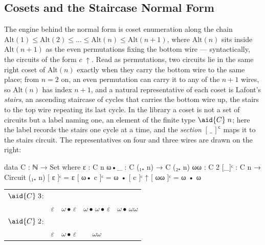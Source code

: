 \subsection{Cosets and the Staircase Normal Form}\label{sec:case-nf}

The engine behind the normal form is coset enumeration along the chain $\mathrm{Alt}(1) \le \mathrm{Alt}(2) \le \dots \le \mathrm{Alt}(n) \le \mathrm{Alt}(n{+}1)$, where $\mathrm{Alt}(n)$ sits inside $\mathrm{Alt}(n{+}1)$ as the even permutations fixing the bottom wire --- syntactically, the circuits of the form $c\;{\uparrow}$. Read as permutations, two circuits lie in the same right coset of $\mathrm{Alt}(n)$ exactly when they carry the bottom wire to the same place; from $n = 2$ on, an even permutation can carry it to any of the $n{+}1$ wires, so $\mathrm{Alt}(n)$ has index $n{+}1$, and a natural representative of each coset is Lafont's \emph{stairs}, an ascending staircase of cycles that carries the bottom wire up, the stairs to the top wire repeating its last cycle. In the library a coset is not a set of circuits but a label naming one, an element of the finite type $\aid{C}\;n$; here the label records the stairs one cycle at a time, and the \emph{section} $[\,\_\,]^{\mathsf c}$ maps it to the stairs circuit. The representatives on four and three wires are drawn on the right:

\begin{center}
\begin{minipage}[c]{0.37\linewidth}
\begingroup\setlength{\mathindent}{0pt}
\begin{code}
data C : ℕ → Set where
  ε   : C n
  ω•_ : C (₁₊ n) → C (₂₊ n)
  ωω  : C 2
[_]ᶜ : C n → Circuit (₁₊ n)
[ ε    ]ᶜ = ε
[ ω• c ]ᶜ = ω • [ c ]ᶜ ↑
[ ωω   ]ᶜ = ω • ω
\end{code}
\endgroup
\end{minipage}\hfill%
\begin{minipage}[c]{0.58\linewidth}\centering\small
\begin{tabular}{@{}l@{\;\;}cccc@{}}
  $\aid{C}\;3$: &  &  &  & \\
  & $\varepsilon$ & $\omega{\bullet}\,\varepsilon$ & $\omega{\bullet}\,\omega{\bullet}\,\varepsilon$ & $\omega{\bullet}\,\omega\omega$\\[4pt]
  $\aid{C}\;2$: &  &  &  & \\
  & $\varepsilon$ & $\omega{\bullet}\,\varepsilon$ & $\omega\omega$ &
\end{tabular}
\end{minipage}
\end{center}

